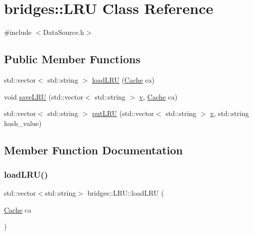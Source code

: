 \hypertarget{classbridges_1_1_l_r_u}{}\section{bridges\+:\+:L\+RU Class Reference}
\label{classbridges_1_1_l_r_u}


{\ttfamily \#include $<$Data\+Source.\+h$>$}

\subsection*{Public Member Functions}
\begin{DoxyCompactItemize}
\item 
std\+::vector$<$ std\+::string $>$ \hyperlink{classbridges_1_1_l_r_u_ae64763303ec79a42d9adf0aea1ac7c29}{load\+L\+RU} (\hyperlink{classbridges_1_1_cache}{Cache} ca)
\item 
void \hyperlink{classbridges_1_1_l_r_u_a1fb694f9c4401d8e9fd3ca0d5cc5562c}{save\+L\+RU} (std\+::vector$<$ std\+::string $>$ \hyperlink{namespacebridges_acfb0a4f7877d8f63de3e6862004c50eda9e3669d19b675bd57058fd4664205d2a}{v}, \hyperlink{classbridges_1_1_cache}{Cache} ca)
\item 
std\+::vector$<$ std\+::string $>$ \hyperlink{classbridges_1_1_l_r_u_a6d5cfb59d2333dd7e20c426a58a9ea55}{put\+L\+RU} (std\+::vector$<$ std\+::string $>$ \hyperlink{namespacebridges_acfb0a4f7877d8f63de3e6862004c50eda9e3669d19b675bd57058fd4664205d2a}{v}, std\+::string hash\+\_\+value)
\end{DoxyCompactItemize}


\subsection{Member Function Documentation}
\mbox{\label{classbridges_1_1_l_r_u_ae64763303ec79a42d9adf0aea1ac7c29}} 
\subsubsection{\texorpdfstring{load\+L\+R\+U()}{loadLRU()}}
{\footnotesize\ttfamily std\+::vector$<$std\+::string$>$ bridges\+::\+L\+R\+U\+::load\+L\+RU (\begin{DoxyParamCaption}\item[{\hyperlink{classbridges_1_1_cache}{Cache}}]{ca }\end{DoxyParamCaption})\hspace{0.3cm}{\ttfamily [inline]}}

